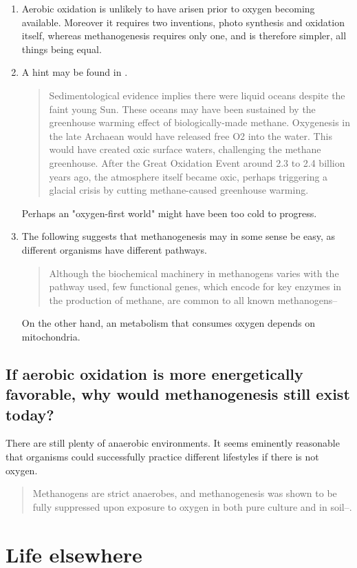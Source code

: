 \documentclass[]{article}
\begin{document}
\begin{enumerate}
	\item Aerobic oxidation is unlikely to have arisen prior to oxygen becoming available. Moreover it requires two inventions, photo synthesis and oxidation itself, whereas methanogenesis requires only one, and is therefore simpler, all things being equal.
	
	\item A hint may be found in \cite{nisbet2011evolution}.\begin{quote}
		Sedimentological evidence implies there were liquid oceans despite the faint young Sun. These oceans may have been sustained by the greenhouse warming effect of biologically-made methane. Oxygenesis in the late Archaean would have released free O2 into the water. This would have created oxic surface waters, challenging the methane greenhouse. After the Great Oxidation Event around 2.3 to 2.4 billion years ago, the atmosphere itself became oxic, perhaps triggering a glacial crisis by cutting methane-caused greenhouse warming.
	\end{quote}
	Perhaps an "oxygen-first world" might have been too cold to progress.
	\item The following suggests that methanogenesis may in some sense be easy, as different organisms have different pathways.
	\begin{quote}
		Although the biochemical machinery in methanogens varies with the pathway used, few functional genes, which encode for key enzymes in the production of methane, are common to all known methanogens--\cite{angel2012methanogenic}
	\end{quote}
	On the other hand, an metabolism that consumes oxygen depends on mitochondria.
\end{enumerate}


\subsection{
	If aerobic oxidation is more energetically favorable, why would methanogenesis still exist today?
}
There are still plenty of anaerobic environments. It seems eminently reasonable that organisms could successfully practice different lifestyles if there is not oxygen.
\begin{quote}
	Methanogens are strict anaerobes, and methanogenesis was shown to be fully suppressed upon exposure to oxygen in both pure culture and in soil--\cite{angel2012methanogenic}.
\end{quote}

\section{Life elsewhere}
\end{document}

